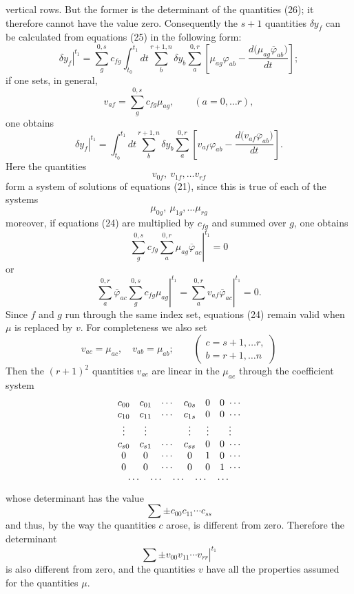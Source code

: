 \documentclass[11pt,a4paper,leqno]{article}
\begin{document}
vertical rows. But the former is the determinant of the quantities (26); it therefore cannot have the value zero. Consequently the $s+1$ quantities $\delta y_f$ can be calculated from equations (25) in the following form:
\[
\left.\delta y_f\right|^{t_1}
=
\sum_g^{0,s}c_{fg}\int_{t_0}^{t_1}dt\sum_b^{r+1,n}\delta y_b\sum_a^{0,r}
\left[
\mu_{ag}\varphi_{ab}-\frac{d\bigl(\mu_{ag}\overline{\varphi}_{ab}\bigr)}{dt}
\right];
\]
if one sets, in general,
\[
v_{af}=\sum_g^{0,s}c_{fg}\mu_{ag},
\qquad(a=0,\ldots r),
\]
one obtains
\begin{equation}\tag{28}
\left.\delta y_f\right|^{t_1}
=
\int_{t_0}^{t_1}dt\sum_b^{r+1,n}\delta y_b\sum_a^{0,r}
\left[
v_{af}\varphi_{ab}-\frac{d\bigl(v_{af}\overline{\varphi}_{ab}\bigr)}{dt}
\right].
\end{equation}
Here the quantities
\[
v_{0f},\ v_{1f},\ldots v_{rf}
\]
form a system of solutions of equations (21), since this is true of each of the systems
\[
\mu_{0g},\ \mu_{1g},\ldots\mu_{rg}
\]
moreover, if equations (24) are multiplied by $c_{fg}$ and summed over $g$, one obtains
\[
\left.
\sum_g^{0,s}c_{fg}\sum_a^{0,r}\mu_{ag}\overline{\varphi}_{ac}
\right|^{t_1}=0
\]
or
\[
\left.
\sum_a^{0,r}\overline{\varphi}_{ac}\sum_g^{0,s}c_{fg}\mu_{ag}
\right|^{t_1}
=
\left.\sum_a^{0,r}v_{af}\overline{\varphi}_{ac}\right|^{t_1}=0.
\]
Since $f$ and $g$ run through the same index set, equations (24) remain valid when $\mu$ is replaced by $v$. For completeness we also set
\[
v_{ac}=\mu_{ac},\quad v_{ab}=\mu_{ab};
\qquad
\left(
\begin{gathered}
c=s+1,\ldots r,\\
b=r+1,\ldots n
\end{gathered}
\right)
\]
Then the $(r+1)^2$ quantities $v_{ae}$ are linear in the $\mu_{ae}$ through the coefficient system
\[
\begin{array}{cccccc}
c_{00}&c_{01}&\cdots&c_{0s}&0&0\ \cdots\\
c_{10}&c_{11}&\cdots&c_{1s}&0&0\ \cdots\\
\vdots&\vdots&&\vdots&\vdots&\vdots\\
c_{s0}&c_{s1}&\cdots&c_{ss}&0&0\ \cdots\\
0&0&\cdots&0&1&0\ \cdots\\
0&0&\cdots&0&0&1\ \cdots\\
\multicolumn{6}{c}{\cdots\quad\cdots\quad\cdots\quad\cdots\quad\cdots}
\end{array}
\]
whose determinant has the value
\[
\sum\mathord{\pm}c_{00}c_{11}\cdots c_{ss}
\]
and thus, by the way the quantities $c$ arose, is different from zero. Therefore the determinant
\[
\left.\sum\mathord{\pm}v_{00}v_{11}\cdots v_{rr}\right|^{t_1}
\]
is also different from zero, and the quantities $v$ have all the properties assumed for the quantities $\mu$.
\end{document}
